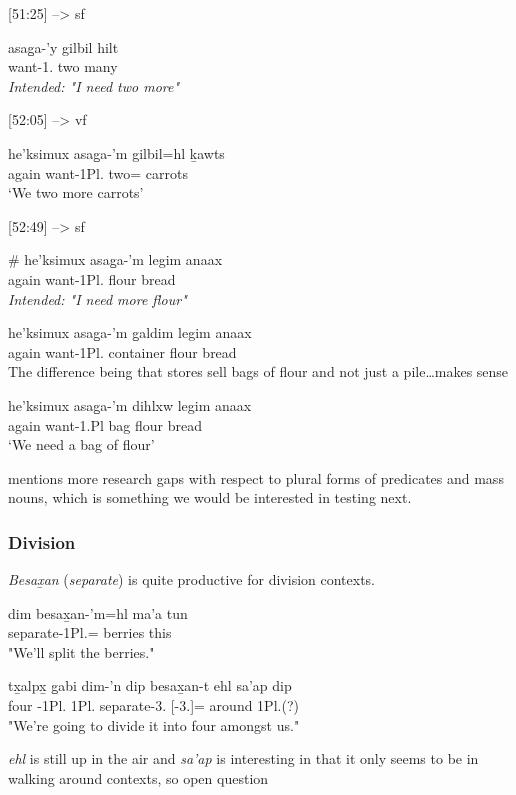 \documentclass{article}
\begin{document}
[51:25] --> sf
\begin{exe}
    \ex \gll * asag̱a-'y gilbil hilt\\
    {} want-1.\Ii{} two many\\
\textit{Intended: "I need two more"}
\end{exe}

[52:05] --> vf
\begin{exe}
\ex \gll he'ksimux asag̱a-'m gilbil=hl ḵawts\\
again want-1Pl.\Ii{} two=\Cn{} carrots\\
`We two more carrots'
\end{exe}

[52:49] --> sf
\begin{exe}
\ex \begin{xlist}
\item \gll \# he'ksimux asag̱a-'m legim anaax\\
{} again want-1Pl.\Ii{} flour bread\\
\textit{Intended: "I need more flour"}
\item \gll he'ksimux asag̱a-'m g̱aldim legim anaax\\
again want-1Pl.\Ii{} container flour bread\\
The difference being that stores sell bags of flour and not just a pile\dots makes sense
\item \gll he'ksimux asag̱a-'m dihlxw legim anaax\\
again want-1.Pl\Ii{} bag flour bread\\
`We need a bag of flour'
\end{xlist}
\end{exe}

\textcite[306]{bicevskisQuantificationGitksan2017} mentions more research gaps with respect to plural forms of predicates and mass nouns, which is something we would be interested in testing next.

\subsubsection{Division}
\textit{Besax̱an} (\textit{separate}) is quite productive for division contexts.
\begin{exe}
\ex \gll dim besax̱an-'m=hl ma'a tun\\
\Fut{} separate-1Pl.\Ii{}=\Cn{} berries this\\
\glt "We'll split the berries."
\end{exe}
\begin{exe}
\ex \gll tx̱alpx̱ g̱abi dim-'n dip besax̱an-t ehl sa'ap dip\\
four \Cnt{} \Fut{}-1Pl.\I{} 1Pl.\I{} separate-3.\Ii{} \Prep{}[-3.\Ii]=\Cn{}  around 1Pl.\Ii{}(?)\\
"We're going to divide it into four amongst us."
\end{exe}
\textit{ehl} is still up in the air and \textit{sa'ap} is interesting in that it only seems to be in walking around contexts, so open question
\end{document}
